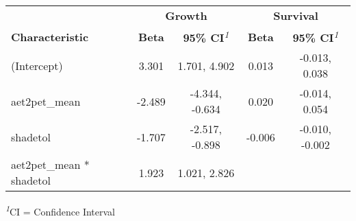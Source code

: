 \setlength{\LTpost}{0mm}
\begin{longtable}{lcccc}
\toprule
 & \multicolumn{2}{c}{\textbf{Growth}} & \multicolumn{2}{c}{\textbf{Survival}} \\ 
\cmidrule(lr){2-3} \cmidrule(lr){4-5}
\textbf{Characteristic} & \textbf{Beta} & \textbf{95\% CI}\textsuperscript{\textit{1}} & \textbf{Beta} & \textbf{95\% CI}\textsuperscript{\textit{1}} \\ 
\midrule
(Intercept) & 3.301 & 1.701, 4.902 & 0.013 & -0.013, 0.038 \\ 
aet2pet\_mean & -2.489 & -4.344, -0.634 & 0.020 & -0.014, 0.054 \\ 
shadetol & -1.707 & -2.517, -0.898 & -0.006 & -0.010, -0.002 \\ 
aet2pet\_mean * shadetol & 1.923 & 1.021, 2.826 &  &  \\ 
\bottomrule
\end{longtable}
\begin{minipage}{\linewidth}
\textsuperscript{\textit{1}}CI = Confidence Interval\\
\end{minipage}

